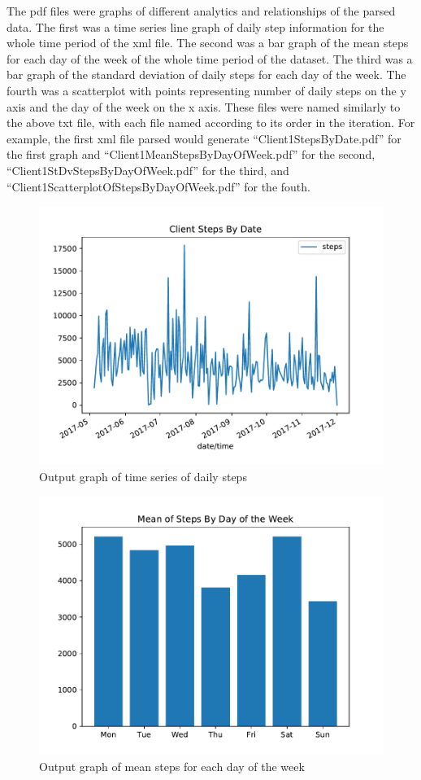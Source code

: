 \documentclass[sigconf]{acmart}
\begin{document}
The pdf files were graphs of different analytics and relationships of the parsed data. The first was a time series line graph of daily step information for the whole time period of the xml file. The second was a bar graph of the mean steps for each day of the week of the whole time period of the dataset. The third was a bar graph of the standard deviation of daily steps for each day of the week. The fourth was a scatterplot with points representing number of daily steps on the y axis and the day of the week on the x axis. These files were named similarly to the above txt file, with each file named according to its order in the iteration. For example, the first xml file parsed would generate ``Client1StepsByDate.pdf'' for the first graph and ``Client1MeanStepsByDayOfWeek.pdf'' for the second, ``Client1StDvStepsByDayOfWeek.pdf'' for the third, and ``Client1ScatterplotOfStepsByDayOfWeek.pdf'' for the fouth.

\begin{figure}[htb]
\includegraphics[width=1.0\columnwidth]{images/Client1StepsByDate.pdf}
\caption{Output graph of time series of daily steps}
\end{figure}

\begin{figure}[htb]
\includegraphics[width=1.0\columnwidth]{images/Client1MeanStepsByDayOfWeek.pdf}
\caption{Output graph of mean steps for each day of the week}
\end{figure}
\end{document}
